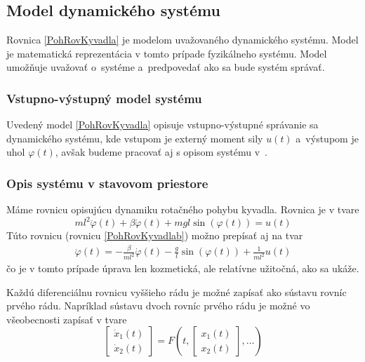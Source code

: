 \documentclass[a4paper, 10pt, ]{article}
\begin{document}
\subsection{Model dynamického systému}

Rovnica \eqref{PohRovKyvadla} je modelom uvažovaného dynamického systému. Model je matematická reprezentácia v tomto prípade fyzikálneho systému. Model umožňuje uvažovať o~systéme a~predpovedať ako sa bude systém správať.

\subsubsection{Vstupno-výstupný model systému}
    
Uvedený model \eqref{PohRovKyvadla} opisuje vstupno-výstupné správanie sa dynamického systému, kde vstupom je externý moment sily $u(t)$ a~výstupom je uhol $\varphi(t)$, avšak budeme pracovať aj s opisom systému v~.


\subsubsection{Opis systému v stavovom priestore}


Máme rovnicu opisujúcu dynamiku rotačného pohybu kyvadla. Rovnica je v tvare
\begin{equation}
    ml^2 \ddot{\varphi}(t) + \beta \dot{\varphi}(t) + mgl\sin{\left(\varphi(t)\right)} = u(t)
\end{equation}
Túto rovnicu (rovnicu \eqref{PohRovKyvadlab}) možno prepísať aj na tvar
\begin{align}
	\ddot{\varphi}(t) = - \frac{\beta}{ml^2} \dot{\varphi}(t) - \frac{g}{l} \sin\left(\varphi(t)\right) + \frac{1}{ml^2}u(t)
\end{align}
čo je v tomto prípade úprava len kozmetická, ale relatívne užitočná, ako sa ukáže.


Každú diferenciálnu rovnicu vyššieho rádu je možné zapísať ako sústavu rovníc prvého rádu. Napríklad sústavu dvoch rovníc prvého rádu je možné vo všeobecnosti zapísať v tvare
\begin{equation} \label{naznak01}
   \begin{bmatrix} \dot x_1(t) \\ \dot x_2(t) \end{bmatrix} = F \left( t, \begin{bmatrix} x_1(t) \\ x_2(t) \end{bmatrix}, \ldots \right)
\end{equation}
\end{document}
